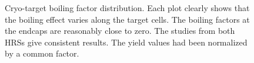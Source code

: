  \begin{figure}[]
  \begin{center}
    \hfill
     \hfill
    \caption[Cryo-target boiling factor distribution]{\footnotesize{Cryo-target boiling factor distribution. Each plot clearly shows that the boiling effect varies along the target cells. The boiling factors at the endcaps are reasonably close to zero. The studies from both HRSs give consistent results. The yield values had been normalized by a common factor.}}
    \label{cryo_boil_fact}
  \end{center}
\end{figure}

